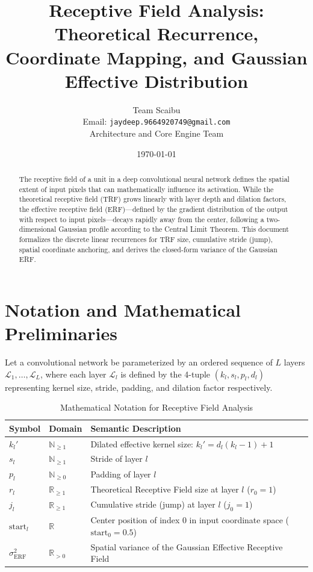 \documentclass[11pt,a4paper]{article}
\title{Receptive Field Analysis: Theoretical Recurrence, Coordinate Mapping, and Gaussian Effective Distribution}
\author{Team Scaibu \\ \small Email: \texttt{jaydeep.9664920749@gmail.com} \\ \small Architecture and Core Engine Team}
\date{\today}
\theoremstyle{definition}
\begin{document}
\maketitle

\begin{abstract}
The receptive field of a unit in a deep convolutional neural network defines the spatial extent of input pixels that can mathematically influence its activation. While the theoretical receptive field (TRF) grows linearly with layer depth and dilation factors, the effective receptive field (ERF)—defined by the gradient distribution of the output with respect to input pixels—decays rapidly away from the center, following a two-dimensional Gaussian profile according to the Central Limit Theorem. This document formalizes the discrete linear recurrences for TRF size, cumulative stride (jump), spatial coordinate anchoring, and derives the closed-form variance of the Gaussian ERF.
\end{abstract}

\section{Notation and Mathematical Preliminaries}

Let a convolutional network be parameterized by an ordered sequence of $L$ layers $\mathcal{L}_1, \dots, \mathcal{L}_L$, where each layer $\mathcal{L}_l$ is defined by the 4-tuple $(k_l, s_l, p_l, d_l)$ representing kernel size, stride, padding, and dilation factor respectively.

\begin{table}[h]
\centering
\caption{Mathematical Notation for Receptive Field Analysis}
\begin{tabular}{lll}
\toprule
\textbf{Symbol} & \textbf{Domain} & \textbf{Semantic Description} \\
\midrule
$k_l'$ & $\mathbb{N}_{\ge 1}$ & Dilated effective kernel size: $k_l' = d_l (k_l - 1) + 1$ \\
$s_l$ & $\mathbb{N}_{\ge 1}$ & Stride of layer $l$ \\
$p_l$ & $\mathbb{N}_{\ge 0}$ & Padding of layer $l$ \\
$r_l$ & $\mathbb{R}_{\ge 1}$ & Theoretical Receptive Field size at layer $l$ ($r_0 = 1$) \\
$j_l$ & $\mathbb{R}_{\ge 1}$ & Cumulative stride (jump) at layer $l$ ($j_0 = 1$) \\
$\text{start}_l$ & $\mathbb{R}$ & Center position of index 0 in input coordinate space ($\text{start}_0 = 0.5$) \\
$\sigma_{\text{ERF}}^2$ & $\mathbb{R}_{> 0}$ & Spatial variance of the Gaussian Effective Receptive Field \\
\bottomrule
\end{tabular}
\end{table}
\end{document}

